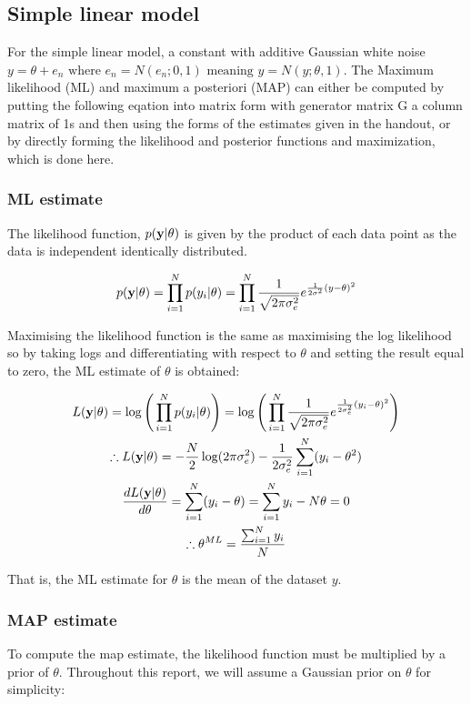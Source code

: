 \documentclass[12pt]{article}
\begin{document}
\subsection{Simple linear model}
For the simple linear model, a constant with additive Gaussian white noise $ y = \theta + e_n \text{ where } e_n = N (e_n;0,1) \text{ meaning } y = N(y;\theta,1)$. The Maximum likelihood (ML) and maximum a posteriori (MAP) can either be computed by putting the following eqation into matrix form with generator matrix G a column matrix of 1s and then using the forms of the estimates given in the handout, or by directly forming the likelihood and posterior functions and maximization, which is done here.
\subsubsection{ML estimate}
The likelihood function, $p(\bold{y}|\theta)$ is given by the product of each data point as the data is independent identically distributed.

\[ 
p(\bold{y}|\theta) = \prod_{i = 1}^{N} p(y_i|\theta) = \prod_{i = 1}^{N} \frac{1}{\sqrt{2\pi \sigma_e^2}}e^{\frac{1}{2\sigma^2}(y-\theta)^2}
\]

Maximising the likelihood function is the same as maximising the log likelihood so by taking logs and differentiating with respect to $\theta$ and setting the result equal to zero, the ML estimate of $\theta$ is obtained:

\begin{gather*}
L(\bold{y}|\theta) = \log \Bigg(\prod_{i = 1}^{N} p(y_i|\theta)\Bigg) = \log \Bigg( \prod_{i = 1}^{N} \frac{1}{\sqrt{2 \pi \sigma_e^2}}e^{\frac{1}{2 \sigma_e^2}(y_i-\theta)^2} \Bigg)
\\
\therefore L(\bold{y}|\theta) = -\frac{N}{2} \log (2 \pi \sigma_e^2) - \frac{1}{2\sigma_e^2} \sum _{i = 1}^N (y_i-\theta^2)
\\
\frac{dL(\bold{y}|\theta)}{d\theta} = \sum _{i = 1}^N (y_i-\theta) = \sum _{i = 1}^N y_i - N\theta = 0
\\
\therefore \theta^{ML} = \frac{\sum _{i = 1}^N y_i}{N}
\\
\end{gather*}

That is, the ML estimate for $\theta$ is the mean of the dataset $y$.

\subsubsection{MAP estimate}
To compute the map estimate, the likelihood function must be multiplied by a prior of $\theta$. Throughout this report, we will assume a Gaussian prior on $\theta$ for simplicity:
\end{document}
